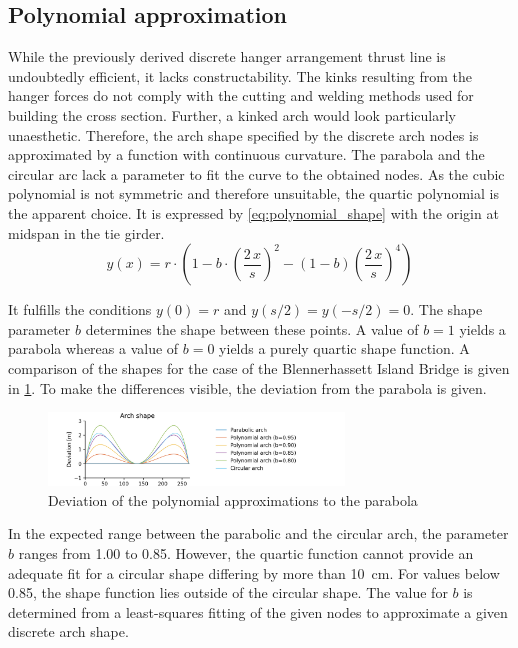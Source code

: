 \subsection{Polynomial approximation} \label{sec:polynomial_approximation}
While the previously derived discrete hanger arrangement thrust line is undoubtedly efficient, it lacks constructability. The kinks resulting from the hanger forces do not comply with the cutting and welding methods used for building the cross section. Further, a kinked arch would look particularly unaesthetic. Therefore, the arch shape specified by the discrete arch nodes is approximated by a function with continuous curvature. The parabola and the circular arc lack a parameter to fit the curve to the obtained nodes. As the cubic polynomial is not symmetric and therefore unsuitable, the quartic polynomial is the apparent choice. It is expressed by \cref{eq:polynomial_shape} with the origin at midspan in the tie girder.
\begin{equation}
    y(x)=r \cdot \left(1 - b \cdot \left(\frac{2\,x}{s}\right)^2 - (1-b) \left(\frac{2\,x}{s}\right)^4 \right)
    \label{eq:polynomial_shape}
\end{equation}

It fulfills the conditions $y(0)=r$ and $y(s/2)=y(-s/2)=0$. The shape parameter $b$ determines the shape between these points. A value of $b=1$ yields a parabola whereas a value of $b=0$ yields a purely quartic shape function. A comparison of the shapes for the case of the Blennerhassett Island Bridge is given in \cref{fig:polynomial_shapes}. To make the differences visible, the deviation from the parabola is given.

\begin{figure}[H]
    \centering
    \includegraphics[trim={1cm 0 3cm 0},clip, width=0.70\textwidth]{illustrations/figures/polynomial shapes.png}
    \caption{Deviation of the polynomial approximations to the parabola}
    \label{fig:polynomial_shapes}
\end{figure}

In the expected range between the parabolic and the circular arch, the parameter $b$ ranges from 1.00 to 0.85. However, the quartic function cannot provide an adequate fit for a circular shape differing by more than \SI{10}{cm}. For values below 0.85, the shape function lies outside of the circular shape. The value for $b$ is determined from a least-squares fitting of the given nodes to approximate a given discrete arch shape.

